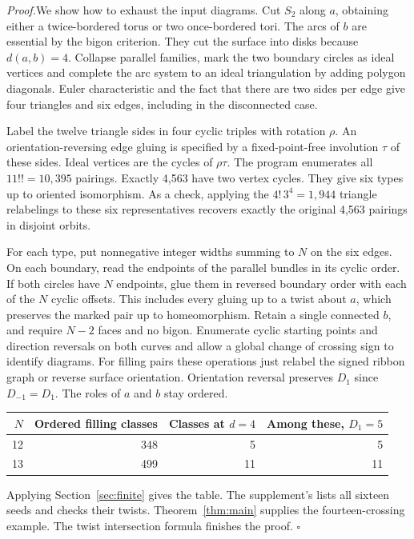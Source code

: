 \documentclass[11pt,a4paper]{article}
\newcommand{\proof}{\par\noindent\textit{Proof.}\enspace}
\newcommand{\qed}{\hfill\(\square\)\par}
\newcommand{\ttcode}[1]{\texttt{\detokenize{#1}}}
\begin{document}
\proof We show how to exhaust the input diagrams. Cut \(S_2\) along
\(a\), obtaining either a twice-bordered torus or two once-bordered tori.
The arcs of \(b\) are essential by the bigon criterion. They cut the
surface into disks because \(d(a,b)=4\). Collapse parallel families,
mark the two boundary circles as ideal vertices and complete the arc
system to an ideal triangulation by adding polygon diagonals. Euler
characteristic and the fact that there are two sides per edge give four
triangles and six edges, including in the disconnected case.

Label the twelve triangle sides in four cyclic triples with rotation
\(\rho\). An orientation-reversing edge gluing is specified by a
fixed-point-free involution \(\tau\) of these sides. Ideal vertices are the
cycles of \(\rho\tau\). The program enumerates all \(11!!=10{,}395\)
pairings. Exactly 4,563 have two vertex cycles. They give six types
up to oriented isomorphism. As a check, applying the
\(4!\,3^4=1{,}944\) triangle relabelings to these six representatives
recovers exactly the original 4,563 pairings in disjoint orbits.

For each type, put nonnegative integer widths summing to \(N\) on the
six edges. On each boundary, read the endpoints of the parallel bundles
in its cyclic order. If both circles have \(N\) endpoints, glue them
in reversed boundary order with each of the \(N\) cyclic offsets. This
includes every gluing up to a twist about \(a\), which preserves the
marked pair up to homeomorphism. Retain a single connected \(b\), and
require \(N-2\) faces and no bigon. Enumerate cyclic starting points and
direction reversals on both curves and allow a global change of crossing
sign to identify diagrams. For filling pairs these operations just
relabel the signed ribbon graph or reverse surface orientation. Orientation
reversal preserves \(D_1\) since \(D_{-1}=D_1\). The roles of \(a\) and
\(b\) stay ordered.

\begin{center}\small
\begin{tabular}{rrrr}
\toprule
\(N\) & Ordered filling classes & Classes at \(d=4\) & Among these, \(D_1=5\)\\
\midrule
12 & 348 & 5 & 5\\
13 & 499 & 11 & 11\\
\bottomrule
\end{tabular}
\end{center}

Applying Section~\ref{sec:finite} gives the table. The supplement's
\ttcode{census_small_seeds.py} lists all sixteen seeds and checks their
twists. Theorem~\ref{thm:main} supplies the fourteen-crossing example.
The twist intersection formula finishes the proof. \qed
\end{document}

